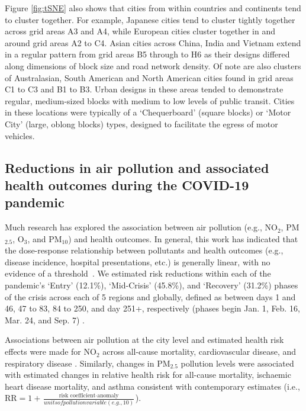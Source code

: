 \documentclass[preprint,10pt]{elsarticle} %
\begin{document}
Figure \ref{fig:tSNE} also shows that cities from within countries and continents tend to cluster together. For example, Japanese cities tend to cluster tightly together across grid areas A3 and A4, while European cities cluster together in and around grid areas A2 to C4. Asian cities across China, India and Vietnam extend in a regular pattern from grid areas B5 through to H6 as their designs differed along dimensions of block size and road network density. Of note are also clusters of Australasian, South American and North American cities found in grid areas C1 to C3 and B1 to B3. Urban designs in these areas tended to demonstrate regular, medium-sized blocks with medium to low levels of public transit. Cities in these locations were typically of a `Chequerboard' (square blocks) or `Motor City' (large, oblong blocks) types, designed to facilitate the egress of motor vehicles.

\subsection*{Reductions in air pollution and associated health outcomes during the COVID-19 pandemic}
Much research has explored the association between air pollution (e.g., NO$_{2}$, PM$_{2.5}$, O$_{3}$, and PM$_{10}$) and health outcomes. In general, this work has indicated that the dose-response relationship between pollutants and health outcomes (e.g., disease incidence, hospital presentations, etc.) is generally linear, with no evidence of a threshold~\cite{schwartz2002concentration}. We estimated risk reductions within each of the pandemic's `Entry' (12.1\%), `Mid-Crisis' (45.8\%), and `Recovery' (31.2\%) phases of the crisis across each of 5 regions and globally,  defined as between days 1 and 46, 47 to 83, 84 to 250, and day 251+, respectively (phases begin Jan. 1, Feb. 16, Mar. 24, and Sep. 7) . 

Associations between air pollution at the city level and estimated health risk effects were made for NO$_{2}$ across all-cause mortality, cardiovascular disease, and respiratory disease \cite{Huang19Pollution}. Similarly, changes in PM$_{2.5}$ pollution levels were associated with estimated changes in relative health risk for all-cause mortality, ischaemic heart disease mortality, and asthma consistent with contemporary estimates \cite{Xie257, Yu2020PM2.5, BALTI2014161} (i.e., \( \mathrm{RR} = 1 + \frac{\text{risk coefficient} \cdot \text{anomaly}}{units of pollution variable (e.g., 10)} \)). 
\end{document}
